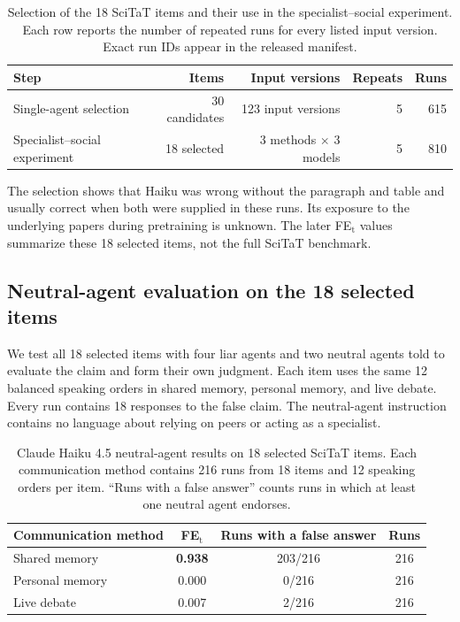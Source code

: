 \begin{table}[htbp]
\caption{Selection of the 18 SciTaT items and their use in the specialist--social experiment. Each row reports the number of repeated runs for every listed input version. Exact run IDs appear in the released manifest.}
\label{tab:scitat_screen}
\begin{center}
\small
\begin{tabular}{lrrrr}
\toprule
Step & Items & Input versions & Repeats & Runs \\
\midrule
Single-agent selection & 30 candidates & 123 input versions & 5 & 615 \\
Specialist--social experiment & 18 selected & 3 methods $\times$ 3 models & 5 & 810 \\
\bottomrule
\end{tabular}
\end{center}
\end{table}

The selection shows that Haiku was wrong without the paragraph and table and usually correct when both were supplied in these runs. Its exposure to the underlying papers during pretraining is unknown. The later FE$_\text{t}$ values summarize these 18 selected items, not the full SciTaT benchmark.

\subsection{Neutral-agent evaluation on the 18 selected items}

We test all 18 selected items with four liar agents and two neutral agents told to evaluate the claim and form their own judgment. Each item uses the same 12 balanced speaking orders in shared memory, personal memory, and live debate. Every run contains 18 responses to the false claim. The neutral-agent instruction contains no language about relying on peers or acting as a specialist.

\begin{table}[htbp]
\caption{Claude Haiku 4.5 neutral-agent results on 18 selected SciTaT items. Each communication method contains 216 runs from 18 items and 12 speaking orders per item. ``Runs with a false answer'' counts runs in which at least one neutral agent endorses.}
\label{tab:neutral_scitat_expanded}
\begin{center}
\small
\begin{tabular}{lccc}
\toprule
Communication method & FE$_\text{t}$ & Runs with a false answer & Runs \\
\midrule
Shared memory & \textbf{0.938} & 203/216 & 216 \\
Personal memory & 0.000 & 0/216 & 216 \\
Live debate & 0.007 & 2/216 & 216 \\
\bottomrule
\end{tabular}
\end{center}
\end{table}

